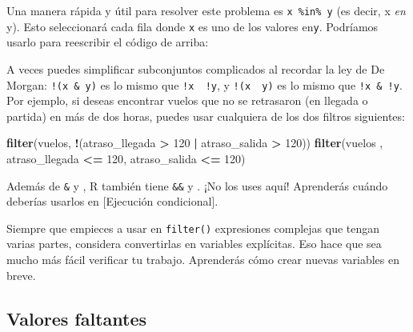 \documentclass[11pt,oneside]{report}
\newenvironment{Shaded}{\begin{snugshade}}{\end{snugshade}}
\newcommand{\DecValTok}[1]{\textcolor[rgb]{0.00,0.00,0.81}{#1}}
\newcommand{\KeywordTok}[1]{\textcolor[rgb]{0.13,0.29,0.53}{\textbf{#1}}}
\newcommand{\NormalTok}[1]{#1}
\newcommand{\OperatorTok}[1]{\textcolor[rgb]{0.81,0.36,0.00}{\textbf{#1}}}
\newcommand{\StringTok}[1]{\textcolor[rgb]{0.31,0.60,0.02}{#1}}
\begin{document}
Una manera rápida y útil para resolver este problema es
\texttt{x\ \%in\%\ y} (es decir, x \emph{en} y). Esto seleccionará cada
fila donde \texttt{x} es uno de los valores en\texttt{y}. Podríamos
usarlo para reescribir el código de arriba:

\begin{Shaded}
\end{Shaded}

A veces puedes simplificar subconjuntos complicados al recordar la ley
de De Morgan: \texttt{!(x\ \&\ y)} es lo mismo que
\texttt{!x\ \textbar{}\ !y}, y \texttt{!(x\ \textbar{}\ y)} es lo mismo
que \texttt{!x\ \&\ !y}. Por ejemplo, si deseas encontrar vuelos que no
se retrasaron (en llegada o partida) en más de dos horas, puedes usar
cualquiera de los dos filtros siguientes:

\begin{Shaded}
\begin{Highlighting}[]
\KeywordTok{filter}\NormalTok{(vuelos, }\OperatorTok{!}\NormalTok{(atraso_llegada }\OperatorTok{>}\StringTok{ }\DecValTok{120} \OperatorTok{|}\StringTok{ }\NormalTok{atraso_salida }\OperatorTok{>}\StringTok{ }\DecValTok{120}\NormalTok{))}
\KeywordTok{filter}\NormalTok{(vuelos  , atraso_llegada }\OperatorTok{<=}\StringTok{ }\DecValTok{120}\NormalTok{, atraso_salida }\OperatorTok{<=}\StringTok{ }\DecValTok{120}\NormalTok{)}
\end{Highlighting}
\end{Shaded}

Además de \texttt{\&} y \texttt{\textbar{}}, R también tiene
\texttt{\&\&} y \texttt{\textbar{}\textbar{}}. ¡No los uses aquí!
Aprenderás cuándo deberías usarlos en {[}Ejecución condicional{]}.

Siempre que empieces a usar en \texttt{filter()} expresiones complejas
que tengan varias partes, considera convertirlas en variables
explícitas. Eso hace que sea mucho más fácil verificar tu trabajo.
Aprenderás cómo crear nuevas variables en breve.

\hypertarget{valores-faltantes}{%
\subsection{Valores faltantes}\label{valores-faltantes}}
\end{document}
